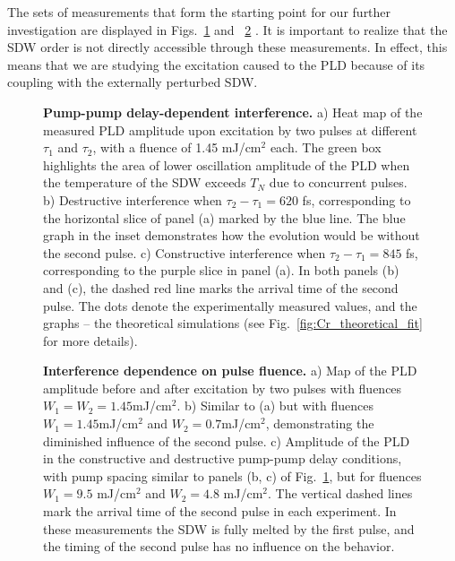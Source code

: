 The sets of measurements that form the starting point for our further investigation are displayed in Figs.~\ref{fig:Cr_experimental1} and ~\ref{fig:Cr_experimental2} \cite{Gorobtsov2021}.
It is important to realize that the \gls{SDW} order is not directly accessible through these measurements. In effect, this means that we are studying the excitation caused to the \gls{PLD} because of its coupling with the externally perturbed \gls{SDW}.
\begin{figure}
	\centering
{}
\caption{\label{fig:Cr_experimental1}{\bf Pump-pump delay-dependent interference.} a) Heat map of the measured \gls{PLD} amplitude upon excitation by two pulses at different $\tau_1$ and $\tau_2$, with a fluence of 1.45 mJ/cm$^2$ each. The green box highlights the area of lower oscillation amplitude of the \gls{PLD} when the temperature of the \gls{SDW} exceeds $T_N$ due to concurrent pulses. b) Destructive interference when $\tau_2 - \tau_1 = 620$ fs, corresponding to the horizontal slice of panel (a) marked by the blue line. The blue graph in the inset demonstrates how the evolution would be without the second pulse. c) Constructive interference when $\tau_2 - \tau_1 = 845$ fs, corresponding to the purple slice in panel (a). In both panels (b) and (c), the dashed red line marks the arrival time of the second pulse. The dots denote the experimentally measured values, and the graphs -- the theoretical simulations (see Fig.~\ref{fig:Cr_theoretical_fit} for more details).\cite{Gorobtsov2021}}
\end{figure}
\begin{figure}
	\centering
{}
\caption{\label{fig:Cr_experimental2}{\bf Interference dependence on pulse fluence.} a) Map of the \gls{PLD} amplitude before and after excitation by two pulses with fluences $W_1=W_2=1.45$mJ/cm$^2$. b) Similar to (a) but with fluences $W_1=1.45$mJ/cm$^2$ and $W_2=0.7$mJ/cm$^2$, demonstrating the diminished influence of the second pulse. c) Amplitude of the \gls{PLD} in the constructive and destructive pump-pump delay conditions, with pump spacing similar to panels (b, c) of Fig.~\ref{fig:Cr_experimental1}, but for fluences $W_1 = 9.5$ mJ/cm$^2$ and $W_2 = 4.8$ mJ/cm$^2$. The vertical dashed lines mark the arrival time of the second pulse in each experiment. In these measurements the \gls{SDW} is fully melted by the first pulse, and the timing of the second pulse has no influence on the behavior.}
\end{figure}

